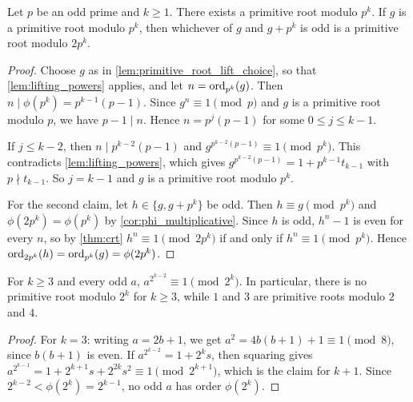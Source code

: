 \begin{theorem}\label{thm:primitive_root_prime_power}
    Let $p$ be an odd prime and $k \ge 1$. There exists a primitive root modulo $p^k$. If $g$ is a primitive root modulo $p^k$, then whichever of $g$ and $g + p^k$ is odd is a primitive root modulo $2p^k$.
\end{theorem}
\begin{proof}
    Choose $g$ as in \cref{lem:primitive_root_lift_choice}, so that \cref{lem:lifting_powers} applies, and let $n = \operatorname{ord}_{p^k}(g)$. Then $n \mid \phi(p^k) = p^{k-1}(p-1)$. Since $g^n \equiv 1 \pmod p$ and $g$ is a primitive root modulo $p$, we have $p - 1 \mid n$. Hence $n = p^j(p-1)$ for some $0 \le j \le k - 1$.

    If $j \le k - 2$, then $n \mid p^{k-2}(p-1)$ and $g^{p^{k-2}(p-1)} \equiv 1 \pmod{p^k}$. This contradicts \cref{lem:lifting_powers}, which gives $g^{p^{k-2}(p-1)} = 1 + p^{k-1}t_{k-1}$ with $p \nmid t_{k-1}$. So $j = k - 1$ and $g$ is a primitive root modulo $p^k$.

    For the second claim, let $h \in \{g, g + p^k\}$ be odd. Then $h \equiv g \pmod{p^k}$ and $\phi(2p^k) = \phi(p^k)$ by \cref{cor:phi_multiplicative}. Since $h$ is odd, $h^n - 1$ is even for every $n$, so by \cref{thm:crt} $h^n \equiv 1 \pmod{2p^k}$ if and only if $h^n \equiv 1 \pmod{p^k}$. Hence $\ord_{2p^k}(h) = \ord_{p^k}(g) = \phi(2p^k)$.
\end{proof}

\begin{proposition}\label{prop:no_primitive_root_power_of_2}
    For $k \ge 3$ and every odd $a$, $a^{2^{k-2}} \equiv 1 \pmod{2^k}$. In particular, there is no primitive root modulo $2^k$ for $k \ge 3$, while $1$ and $3$ are primitive roots modulo $2$ and $4$.
\end{proposition}
\begin{proof}
    For $k = 3$: writing $a = 2b + 1$, we get $a^2 = 4b(b+1) + 1 \equiv 1 \pmod 8$, since $b(b+1)$ is even. If $a^{2^{k-2}} = 1 + 2^k s$, then squaring gives $a^{2^{k-1}} = 1 + 2^{k+1}s + 2^{2k}s^2 \equiv 1 \pmod{2^{k+1}}$, which is the claim for $k + 1$. Since $2^{k-2} < \phi(2^k) = 2^{k-1}$, no odd $a$ has order $\phi(2^k)$.
\end{proof}

